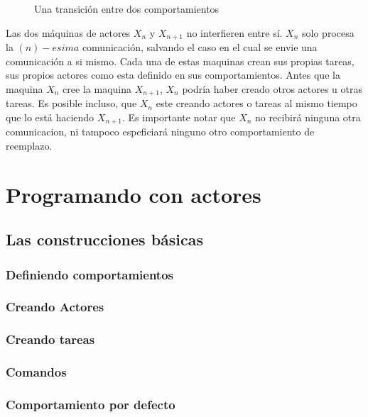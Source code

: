 \begin{figure}[H]
\caption{Una transición entre dos comportamientos}
\label{fig:actortransition}
\end{figure}

Las dos máquinas de actores $X_n$ y $X_{n+1}$ no interfieren entre sí. $X_n$ solo procesa la $(n)-esima$ comunicación, salvando el caso en el cual se envie una comunicación a si mismo. Cada una de estas maquinas crean sus propias tareas, sus propios actores como esta definido en sus comportamientos. Antes que la maquina $X_n$ cree la maquina $X_{n+1}$, $X_n$ podría haber creado otros actores u otras tareas. Es posible incluso, que $X_n$ este creando actores o tareas al mismo tiempo que lo está haciendo $X_{n+1}$. Es importante notar que $X_n$ no recibirá ninguna otra comunicacion, ni tampoco espeficiará ninguno otro comportamiento de reemplazo.

\section{Programando con actores}

\subsection{Las construcciones básicas}

\subsubsection*{Definiendo comportamientos}
\subsubsection*{Creando Actores}
\subsubsection*{Creando tareas}

\subsubsection*{Comandos}

\subsubsection*{Comportamiento por defecto}




